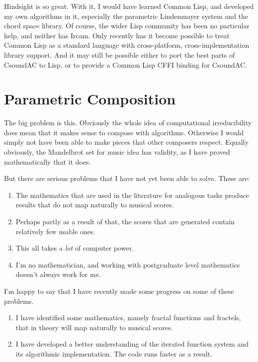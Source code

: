 \documentclass[a4paper,10pt]{scrartcl}
\begin{document}
Hindsight is so great. With it, I would have learned Common Lisp, and 
developed my own algorithms in it, especially the parametric Lindenmayer system 
and the chord space library. Of course, the wider Lisp community has been no 
particular help, and neither has Ircam. Only recently has it become possible 
to treat Common Lisp as a standard language with cross-platform, 
cross-implementation library support. And it may still be possible either to 
port the best parts of CsoundAC to Lisp, or to provide a Common Lisp CFFI 
binding for CsoundAC.

\section*{Parametric Composition}

The big problem is this. Obviously the whole idea of computational 
irreducibility does mean that it makes sense to compose with algorithms. 
Otherwise I would simply not have been able to make pieces that other composers 
respect. Equally obviously, the Mandelbrot set for music idea has validity, as 
I have proved mathematically that it does. 

But there are serious problems that I have not yet been able to solve. These 
are:

\begin{enumerate}
 \item The mathematics that are used in the literature for analogous tasks 
produce results that do not map naturally to musical scores.
 \item Perhaps partly as a result of that, the scores that are generated 
contain relatively few usable ones.
 \item This all takes a \emph{lot} of computer power.
 \item I'm no mathematician, and working with postgraduate level mathematics 
doesn't always work for me.
\end{enumerate}

I'm happy to say that I have recently made some progress on some of these 
problems. 

\begin{enumerate}
 \item I have identified some mathematics, namely fractal functions and 
fractels, that in theory will map naturally to musical scores. 
 \item I have developed a better understanding of the iterated function 
system and its algorithmic implementation. The code runs faster as a result.
\end{enumerate}
\end{document}
